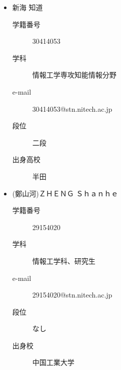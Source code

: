 \documentclass[a4paper,11pt,dvipdfmx]{jsarticle}
\begin{document}
\begin{itemize}
    \item 新海 知道
    \begin{description}
        \item[学籍番号]30414053
        \item[学科] 情報工学専攻知能情報分野
        \item[e-mail]30414053@stn.nitech.ac.jp
        \item[段位]二段
        \item[出身高校]半田
    \end{description}
\end{itemize}
\begin{itemize}
    \item (鄭山河)ＺＨＥＮＧ Ｓｈａｎｈｅ
    \begin{description}
        \item[学籍番号]29154020
        \item[学科] 情報工学科、研究生
        \item[e-mail]29154020@stn.nitech.ac.jp
        \item[段位]なし
        \item[出身校]中国工業大学
    \end{description}
\end{itemize}
\end{document}

